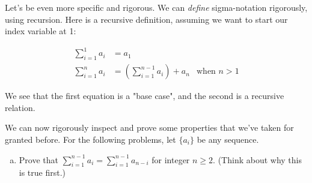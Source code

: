 \begin{problem}
Let's be even more specific and rigorous. We can \emph{define} sigma-notation rigorously, using recursion. Here is a recursive definition, assuming we want to start our index variable at 1:


\begin{align*}
\sum_{i=1}^1 a_i &= a_1 \\
\sum_{i=1}^n a_i &= \left(\sum_{i=1}^{n-1} a_i\right) + a_n & \text{when } n > 1
\end{align*}

We see that the first equation is a "base case", and the second is a recursive relation. 




We can now rigorously inspect and prove some properties that we've taken for granted before. For the following problems, let $\{a_i\}$ be any sequence. 



\begin{enumerate}[(a)]
\item Prove that $\sum_{i=1}^{n-1} a_i = \sum_{i=1}^{n-1} a_{n-i}$ for integer $n \geq 2$. (Think about why this is true first.)
\end{enumerate}


\end{problem}


